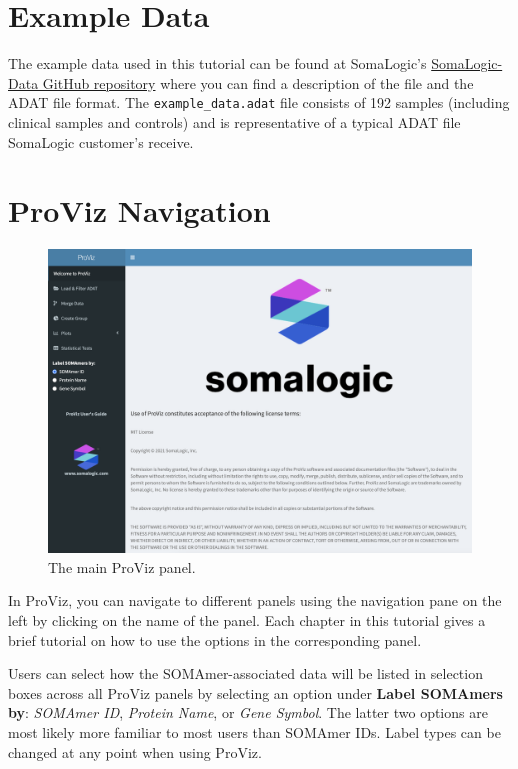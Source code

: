 \documentclass[
]{book}
\begin{document}
\hypertarget{example-data}{%
\section{Example Data}\label{example-data}}

The example data used in this tutorial can be found at SomaLogic's \href{https://github.com/SomaLogic/SomaLogic-Data}{SomaLogic-Data GitHub repository} where you can find a description of the file and the ADAT file format. The \texttt{example\_data.adat} file consists of 192 samples (including clinical samples and controls) and is representative of a typical ADAT file SomaLogic customer's receive.

\hypertarget{proviz-navigation}{%
\section{ProViz Navigation}\label{proviz-navigation}}

\begin{figure}
\centering
\includegraphics{images/ProViz_main.png}
\caption{The main ProViz panel.}
\end{figure}

In ProViz, you can navigate to different panels using the navigation pane on the left by clicking on the name of the panel. Each chapter in this tutorial gives a brief tutorial on how to use the options in the corresponding panel.

Users can select how the SOMAmer-associated data will be listed in selection boxes across all ProViz panels by selecting an option under \textbf{Label SOMAmers by}: \emph{SOMAmer ID}, \emph{Protein Name}, or \emph{Gene Symbol}. The latter two options are most likely more familiar to most users than SOMAmer IDs. Label types can be changed at any point when using ProViz.
\end{document}
